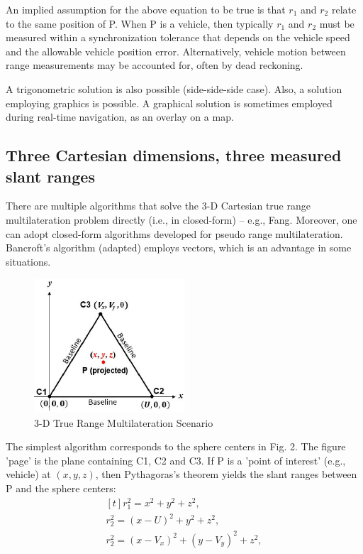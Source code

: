An implied assumption for the above equation to be true is that $r_{1}$ and $r_{2}$ relate to
the same position of P.
When P is a vehicle, then typically $r_{1}$ and $r_{2}$ must be measured within a
synchronization tolerance that depends on the vehicle speed and the allowable vehicle
position error.
Alternatively, vehicle motion between range measurements may be accounted for,
often by dead reckoning.

A trigonometric solution is also possible (side-side-side case). Also, a solution employing 
graphics is possible. A graphical solution is sometimes employed during real-time navigation,
as an overlay on a map. 

\subsection{Three Cartesian dimensions, three measured slant ranges}
There are multiple algorithms that solve the 3-D Cartesian true range 
multilateration problem directly (i.e., in closed-form) – e.g., Fang.
 Moreover, one can adopt closed-form algorithms developed for pseudo range multilateration.
 Bancroft's algorithm (adapted) employs vectors, which is an advantage in some situations. 
\begin{figure}[htb] 
	\label{fig:three_beacon_local}
	\centering
	\includegraphics[width=0.5\textwidth]{figures/three_beacon_local}
	\caption{3-D True Range Multilateration Scenario}
\end{figure}
The simplest algorithm corresponds to the sphere centers in Fig. 2. The figure 'page' is the
plane containing C1, C2 and C3. If P is a 'point of interest' (e.g., vehicle) at $(x,y,z)$,
then Pythagoras's theorem yields the slant ranges between P and the sphere centers: 
\begin{equation}
	\label{equ:three_point_pyt}
	\begin{aligned}[t]
		r_{1}^{2}=x^{2}+y^{2}+z^{2},\\
		r_{2}^{2}=(x-U)^{2}+y^{2}+z^{2},\\
		r_{2}^{2}=(x-V_{x})^{2}+(y-V_{y})^{2}+z^{2},\\
	\end{aligned}
\end{equation}
